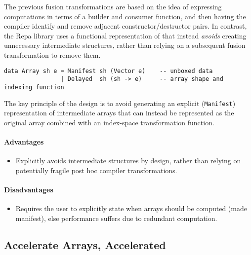 The previous fusion transformations are based on the idea of expressing
computations in terms of a builder and consumer function, and then having the
compiler identify and remove adjacent constructor/destructor pairs. In contrast,
the Repa \cite{Keller:2010} library uses a functional representation of
 that instead \emph{avoids} creating unnecessary
intermediate structures, rather than relying on a subsequent fusion
transformation to remove them.

\begin{lstlisting}[style=Haskell,numbers=none,caption={Repa-1 style array definition},label={lst:repa_arrays}]
data Array sh e = Manifest sh (Vector e)    -- unboxed data
                | Delayed  sh (sh -> e)     -- array shape and indexing function
\end{lstlisting}

The key principle of the design is to avoid generating an explicit
(\texttt{Manifest}) representation of intermediate arrays that can instead be
represented as the original array combined with an index-space transformation
function.


\paragraph{Advantages}
\begin{itemize}
    \item Explicitly avoids intermediate structures by design, rather than
        relying on potentially fragile post hoc compiler transformations.
\end{itemize}

\paragraph{Disadvantages}
\begin{itemize}
    \item Requires the user to explicitly state when arrays should be computed
        (made manifest), else performance suffers due to redundant computation.
\end{itemize}



\subsection{Accelerate Arrays, Accelerated}

